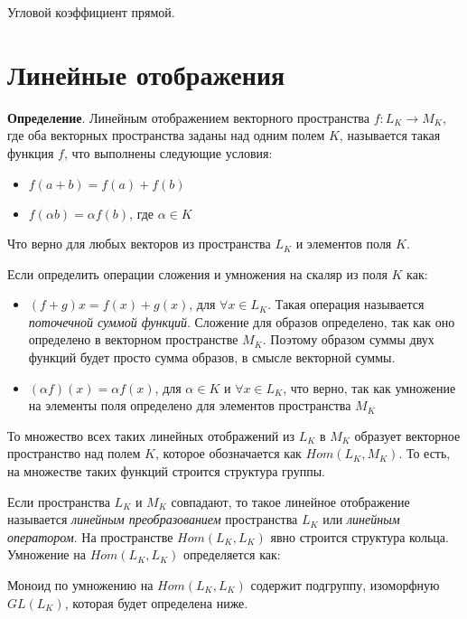 \documentclass[a4paper]{book}
\begin{document}
Угловой коэффициент прямой. 

\section{Линейные отображения}

\textbf{Определение}. Линейным отображением векторного пространства $f: L_K \rightarrow M_K$, где оба векторных пространства заданы над одним полем $K$, называется такая функция $f$, что выполнены следующие условия: 

\begin{itemize}
	\item $f(a+b) = f(a) +f(b)$ 
	\item $f(\alpha b) = \alpha f(b)$, где $\alpha \in K$
\end{itemize}
Что верно для любых векторов из пространства $L_K$ и элементов поля $K$. 

Если определить операции сложения и умножения на скаляр из поля $K$ как: 

\begin{itemize}
	\item $(f+g)x = f(x) + g(x)$, для $\forall x\in L_K$. Такая операция называется \textit{поточечной суммой функций}. Сложение для образов определено, так как оно определено в векторном пространстве $M_K$. Поэтому образом суммы двух функций будет просто сумма образов, в смысле векторной суммы. 
	\item $(\alpha f)(x) = \alpha f(x)$, для $\alpha \in K$ и $\forall x\in L_K$, что верно, так как умножение на элементы поля определено для элементов пространства $M_K$
\end{itemize}

То множество всех таких линейных отображений из $L_K$ в $M_K$ образует векторное пространство над полем $K$, которое обозначается как $Hom(L_K,M_K)$. То есть, на множестве таких функций строится структура группы.  

Если пространства $L_K$ и $M_K$ совпадают, то такое линейное отображение называется \textit{линейным преобразованием} пространства $L_K$ или \textit{линейным оператором}. На пространстве $Hom(L_K,L_K)$ явно строится структура кольца. Умножение на $Hom(L_K,L_K)$ определяется как:




Моноид по умножению на $Hom(L_K,L_K)$ содержит подгруппу, изоморфную $GL(L_K)$, которая будет определена ниже. 
\end{document}
